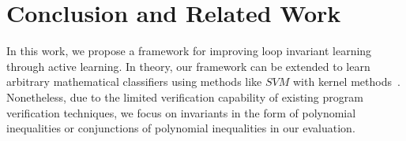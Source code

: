
\section{Conclusion and Related Work} %
\label{sec:related}
In this work, we propose a framework for improving loop invariant learning through active learning. 
In theory, our framework can be extended to learn arbitrary mathematical classifiers using methods like $\mathit{SVM}$ with kernel methods~\cite{svm:kernel}. 
Nonetheless, due to the limited verification capability of existing program verification techniques, 
we focus on invariants in the form of polynomial inequalities or conjunctions of polynomial inequalities in our evaluation.



